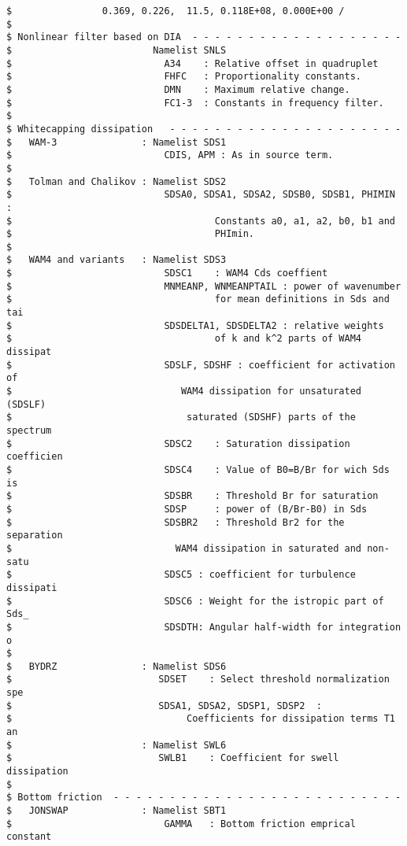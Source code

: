 \begin{footnotesize}
\begin{verbatim}
$                0.369, 0.226,  11.5, 0.118E+08, 0.000E+00 /
$
$ Nonlinear filter based on DIA  - - - - - - - - - - - - - - - - - - -
$                         Namelist SNLS
$                           A34    : Relative offset in quadruplet
$                           FHFC   : Proportionality constants.
$                           DMN    : Maximum relative change.
$                           FC1-3  : Constants in frequency filter.
$
$ Whitecapping dissipation   - - - - - - - - - - - - - - - - - - - - -
$   WAM-3               : Namelist SDS1
$                           CDIS, APM : As in source term.
$
$   Tolman and Chalikov : Namelist SDS2
$                           SDSA0, SDSA1, SDSA2, SDSB0, SDSB1, PHIMIN :
$                                    Constants a0, a1, a2, b0, b1 and
$                                    PHImin.
$
$   WAM4 and variants   : Namelist SDS3
$                           SDSC1    : WAM4 Cds coeffient
$                           MNMEANP, WNMEANPTAIL : power of wavenumber
$                                    for mean definitions in Sds and tai
$                           SDSDELTA1, SDSDELTA2 : relative weights 
$                                    of k and k^2 parts of WAM4 dissipat
$                           SDSLF, SDSHF : coefficient for activation of
$                              WAM4 dissipation for unsaturated (SDSLF) 
$                               saturated (SDSHF) parts of the spectrum
$                           SDSC2    : Saturation dissipation coefficien
$                           SDSC4    : Value of B0=B/Br for wich Sds is 
$                           SDSBR    : Threshold Br for saturation
$                           SDSP     : power of (B/Br-B0) in Sds
$                           SDSBR2   : Threshold Br2 for the separation 
$                             WAM4 dissipation in saturated and non-satu
$                           SDSC5 : coefficient for turbulence dissipati
$                           SDSC6 : Weight for the istropic part of Sds_
$                           SDSDTH: Angular half-width for integration o
$
$   BYDRZ               : Namelist SDS6
$                          SDSET    : Select threshold normalization spe
$                          SDSA1, SDSA2, SDSP1, SDSP2  :
$                               Coefficients for dissipation terms T1 an
$                       : Namelist SWL6
$                          SWLB1    : Coefficient for swell dissipation
$
$ Bottom friction  - - - - - - - - - - - - - - - - - - - - - - - - - -
$   JONSWAP             : Namelist SBT1
$                           GAMMA   : Bottom friction emprical constant

\end{verbatim}
\end{footnotesize}
